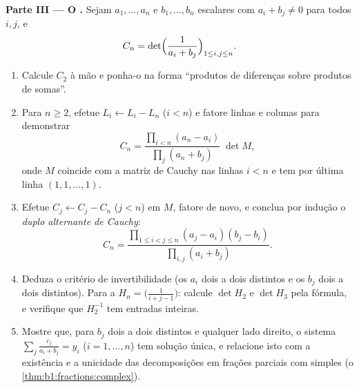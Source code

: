 \begin{problem}
\medskip
\noindent\textbf{Parte III --- O .} Sejam
$a_1,
\dots, a_n$ e $b_1, \dots, b_n$ escalares com $a_i + b_j
\neq 0$ para todos $i, j$, e
\[
C_n = \det\Bigl(\frac{1}{a_i + b_j}\Bigr)_{1 \leq i, j \leq n} .
\]
\begin{enumerate}[resume]
  \item Calcule $C_2$ à mão e ponha-o na forma ``produtos de
        diferenças sobre produtos de somas''.
  \item Para $n \geq 2$, efetue $L_i \leftarrow L_i - L_n$ ($i <
        n$) e fatore linhas e colunas
        para demonstrar
        \[
        C_n = \frac{\prod_{i<n}(a_n - a_i)}{\prod_{j}(a_n +
        b_j)}\;\det M,
        \]
        onde $M$ coincide com a matriz de Cauchy nas linhas $i < n$
        e tem por última linha $(1, 1, \dots, 1)$.
  \item Efetue $C_j \leftarrow C_j - C_n$ ($j < n$) em $M$, fatore de novo, e conclua por
        indução o \emph{duplo alternante de Cauchy}:
        \[
        C_n = \frac{\prod_{1 \leq i < j \leq n}(a_j - a_i)(b_j -
        b_i)}{\prod_{i, j}(a_i + b_j)} .
        \]
  \item Deduza o critério de invertibilidade (os $a_i$ dois a dois
        distintos e os $b_j$ dois a dois distintos). Para a
        \emph{} $H_n = \bigl(\frac{1}{i + j -
        1}\bigr)$: calcule $\det H_2$ e $\det H_3$ pela
        fórmula, e verifique que $H_2^{-1}$ tem entradas inteiras.
  \item Mostre que, para $b_j$ dois a dois distintos e qualquer lado
        direito, o sistema $\sum_j \frac{c_j}{a_i + b_j} = y_i$ ($i = 1, \dots, n$) tem solução única, e
        relacione isto com a existência e a unicidade das
        decomposições em frações parciais com  simples
        (o \cref{thm:b1:fractions:complex}).
\end{enumerate}


\end{problem}
